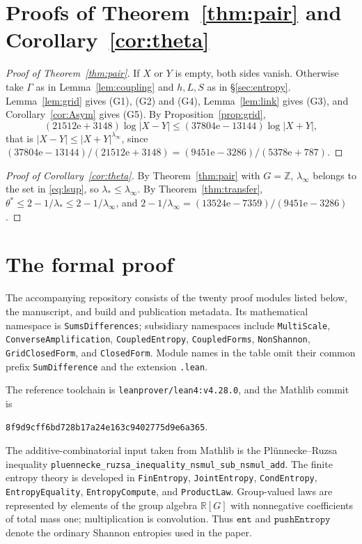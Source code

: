 \documentclass[11pt]{amsart}
\theoremstyle{definition}
\theoremstyle{remark}
\numberwithin{equation}{section}
\newcommand{\Z}{\mathbb{Z}}
\newcommand{\R}{\mathbb{R}}
\newcommand{\e}{\mathrm{e}}
\newcommand{\lamI}{\lambda_\infty}
\newcommand{\lsup}{\lambda_*}
\newcommand{\lean}[1]{\texttt{#1}}
\begin{document}
\section{Proofs of Theorem~\ref{thm:pair} and Corollary~\ref{cor:theta}}\label{sec:assembly}

\begin{proof}[Proof of Theorem~\ref{thm:pair}]
If $X$ or $Y$ is empty, both sides vanish. Otherwise take $\Gamma$ as in Lemma~\ref{lem:coupling}
and $h,L,S$ as in \S\ref{sec:entropy}. Lemma~\ref{lem:grid} gives (G1), (G2) and (G4),
Lemma~\ref{lem:link} gives (G3), and Corollary~\ref{cor:Asym} gives (G5). By
Proposition~\ref{prop:grid},
\[
  (21512\e+3148)\log|X-Y|\le(37804\e-13144)\log|X+Y| ,
\]
that is $|X-Y|\le|X+Y|^{\lamI}$, since
$(37804\e-13144)/(21512\e+3148)=(9451\e-3286)/(5378\e+787)$.
\end{proof}

\begin{proof}[Proof of Corollary~\ref{cor:theta}]
By Theorem~\ref{thm:pair} with $G=\Z$, $\lamI$ belongs to the set in \eqref{eq:lsup}, so
$\lsup\le\lamI$. By Theorem~\ref{thm:transfer}, $\theta^\ast\le2-1/\lsup\le2-1/\lamI$, and
$2-1/\lamI=(13524\e-7359)/(9451\e-3286)$.
\end{proof}

\appendix

\section{The formal proof}\label{app:lean}

The accompanying repository consists of the twenty proof modules listed
below, the manuscript, and build and publication metadata. Its mathematical
namespace is \lean{SumsDifferences}; subsidiary namespaces include
\lean{MultiScale}, \lean{ConverseAmplification}, \lean{CoupledEntropy},
\lean{CoupledForms}, \lean{NonShannon}, \lean{GridClosedForm}, and
\lean{ClosedForm}. Module names in the table omit their common prefix
\lean{SumDifference} and the extension \lean{.lean}.

The reference toolchain is \lean{leanprover/lean4:v4.28.0}, and the
Mathlib commit is
\begin{center}
\texttt{8f9d9cff6bd728b17a24e163c9402775d9e6a365}.
\end{center}
The additive-combinatorial input taken from Mathlib is the
Pl\"unnecke--Ruzsa inequality
\lean{pluennecke\_\allowbreak{}ruzsa\_\allowbreak{}inequality\_\allowbreak{}nsmul\_\allowbreak{}sub\_\allowbreak{}nsmul\_\allowbreak{}add}.
The finite entropy theory is developed in
\lean{FinEntropy}, \lean{JointEntropy}, \lean{CondEntropy},
\lean{EntropyEquality}, \lean{EntropyCompute}, and \lean{ProductLaw}.
Group-valued laws are represented by elements of the group algebra
$\R[G]$ with nonnegative coefficients of total mass one; multiplication
is convolution. Thus $\lean{ent}$ and $\lean{pushEntropy}$ denote the
ordinary Shannon entropies used in the paper.
\end{document}
